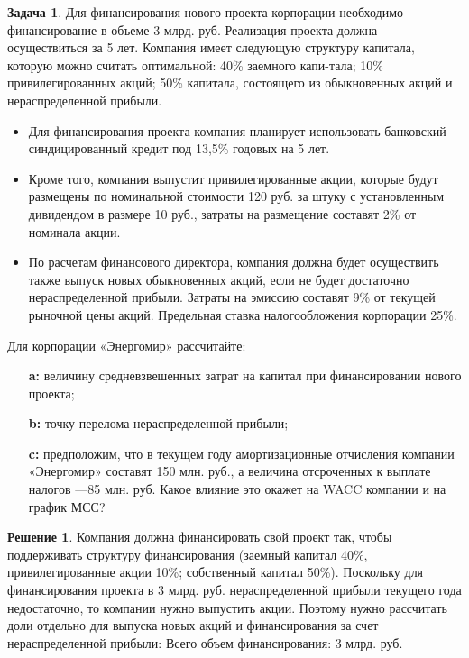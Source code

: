 \documentclass[a4paper, 14pt]{article}
\theoremstyle{plain} %
\theoremstyle{definition} %
\newtheorem*{solution}{Решение}
\newtheorem{problem}{Задача}[subsection]
\theoremstyle{remark} %
\begin{document}
\begin{problem}
	Для финансирования нового проекта корпорации необходимо финансирование в объеме 3 млрд. руб. Реализация проекта должна осуществиться за 5 лет. Компания имеет следующую структуру капитала, которую можно считать оптимальной: 40\% заемного капи-тала; 10\% привилегированных акций; 50\% капитала, состоящего из обыкновенных акций и нераспределенной прибыли.
	\begin{itemize}
		\item Для  финансирования  проекта  компания  планирует  использовать  банковский синдицированный кредит под 13,5\% годовых на 5 лет.
		\item Кроме  того,  компания  выпустит  привилегированные  акции,  которые  будут размещены  по  номинальной  стоимости  120  руб.  за  штуку  с  установленным дивидендом в размере 10 руб., затраты на размещение составят 2\% от номинала акции.
		\item По расчетам финансового директора, компания должна будет осуществить также выпуск новых обыкновенных акций, если не будет достаточно нераспределенной прибыли. Затраты на эмиссию составят 9\% от текущей рыночной цены акций. Предельная ставка налогообложения корпорации 25\%.
	\end{itemize}
	Для корпорации «Энергомир» рассчитайте:
	\begin{itemize}
		\item[\textbf{a:}] величину средневзвешенных затрат на капитал при финансировании нового проекта;
		\item[\textbf{b:}] точку перелома нераспределенной прибыли;
		\item[\textbf{c:}] предположим,  что  в  текущем  году  амортизационные  отчисления  компании «Энергомир» составят 150 млн. руб., а величина отсроченных к выплате налогов —85 млн. руб. Какое влияние это окажет на WACC компании и на график МСС?
	\end{itemize}
	\begin{solution}
		Компания должна финансировать свой проект так, чтобы поддерживать структуру финансирования  (заемный капитал  40\%, привилегированные акции  10\%; собственный капитал  50\%). Поскольку для финансирования проекта в  3 млрд. руб. нераспределенной прибыли текущего года недостаточно, то компании нужно выпустить акции. Поэтому нужно рассчитать доли отдельно для выпуска новых акций и финансирования за счет нераспределенной прибыли: Всего объем финансирования: 3 млрд. руб.


\end{solution}
\end{problem}
\end{document}

